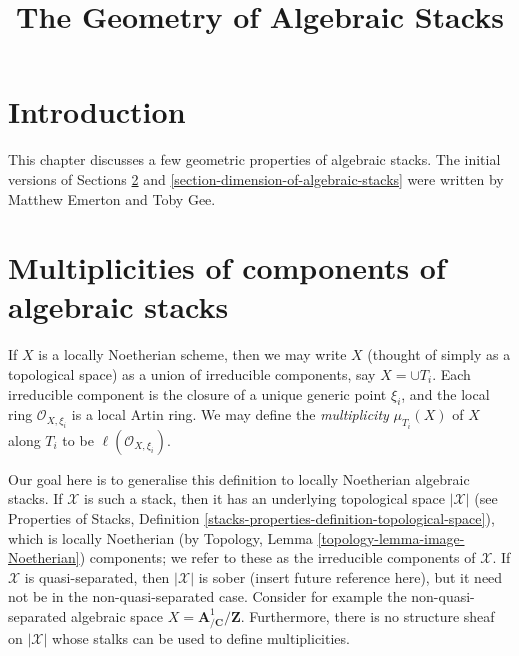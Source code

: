 

%


\title{The Geometry of Algebraic Stacks}


\maketitle

\label{section-phantom}

\tableofcontents

\section{Introduction}
\label{section-introduction}

\noindent
This chapter discusses a few geometric properties of algebraic stacks.
The initial versions of Sections \ref{section-multiplicities} and
\ref{section-dimension-of-algebraic-stacks}
were written by Matthew Emerton and Toby Gee.






\section{Multiplicities of components of algebraic stacks}
\label{section-multiplicities}

\noindent
If $X$ is a locally Noetherian scheme, then we may write $X$ (thought
of simply as a topological space) as a union
of irreducible components, say $X = \cup T_i.$  Each irreducible
component is the closure of a unique generic point $\xi_i$,
and the local ring $\mathcal O_{X,\xi_i}$ is a local Artin ring.
We may define the {\it multiplicity} $\mu_{T_i}(X)$ of $X$ along $T_i$
to be $\ell(\mathcal O_{X,\xi_i})$.

\medskip\noindent
Our goal here is to generalise this definition to locally
Noetherian algebraic stacks. If $\mathcal{X}$ is such a stack,
then it has an underlying topological space $|\mathcal{X}|$
(see Properties of Stacks, Definition
\ref{stacks-properties-definition-topological-space}),
which is locally Noetherian
(by Topology, Lemma \ref{topology-lemma-image-Noetherian})
components; we refer to these as the irreducible components of $\mathcal{X}$.
If $\mathcal{X}$ is quasi-separated, then $|\mathcal{X}|$ is sober
(insert future reference here), but it need not be in the
non-quasi-separated case. Consider for example the non-quasi-separated
algebraic space $X = \mathbf{A}^1_{/\mathbf{C}}/\mathbf{Z}$.
Furthermore, there is no structure sheaf
on $|\mathcal{X}|$ whose stalks can be used to define multiplicities.

